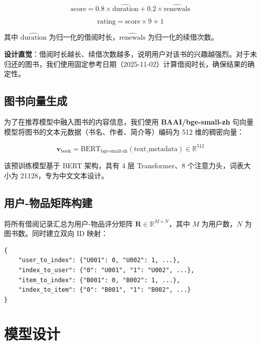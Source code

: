 \documentclass[12pt,a4paper]{article}
\begin{document}
\begin{equation}
    \text{score} = 0.8 \times \widehat{\text{duration}} + 0.2 \times \widehat{\text{renewals}}
\end{equation}

\begin{equation}
    \text{rating} = \text{score} \times 9 + 1
\end{equation}

其中 $\widehat{\text{duration}}$ 为归一化的借阅时长，$\widehat{\text{renewals}}$ 为归一化的续借次数。

\textbf{设计直觉}：借阅时长越长、续借次数越多，说明用户对该书的兴趣越强烈。对于未归还的图书，我们使用固定参考日期（2025-11-02）计算借阅时长，确保结果的确定性。

\subsection{图书向量生成}

为了在推荐模型中融入图书的内容信息，我们使用 \textbf{BAAI/bge-small-zh} 句向量模型将图书的文本元数据（书名、作者、简介等）编码为 512 维的稠密向量：

\begin{equation}
    \mathbf{v}_{\text{book}} = \text{BERT}_{\text{bge-small-zh}}(\text{text\_metadata}) \in \mathbb{R}^{512}
\end{equation}

该预训练模型基于 BERT 架构，具有 4 层 Transformer、8 个注意力头，词表大小为 21128，专为中文文本设计。

\subsection{用户-物品矩阵构建}

将所有借阅记录汇总为用户-物品评分矩阵 $\mathbf{R} \in \mathbb{R}^{M \times N}$，其中 $M$ 为用户数，$N$ 为图书数。同时建立双向 ID 映射：

\begin{lstlisting}[caption={ID 映射结构},label={lst:id_mapping}]
{
    "user_to_index": {"U001": 0, "U002": 1, ...},
    "index_to_user": {"0": "U001", "1": "U002", ...},
    "item_to_index": {"B001": 0, "B002": 1, ...},
    "index_to_item": {"0": "B001", "1": "B002", ...}
}
\end{lstlisting}

\section{模型设计}
\end{document}
